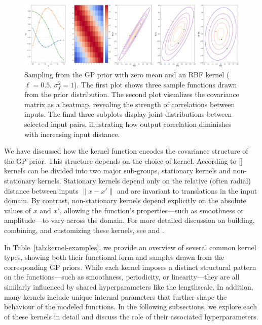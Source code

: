 \documentclass[10pt]{article}
\begin{document}
\begin{figure}[H]
    \centering
       \includegraphics[width=\textwidth]{LatexPlots/1dplots/Kernel_background.png}
        \caption{Sampling from the GP prior with zero mean and an RBF kernel ($\ell = 0.5$, $\sigma_f^2 = 1$). 
        The first plot shows three sample functions drawn from the prior distribution. 
        The second plot visualizes the covariance matrix as a heatmap, revealing the strength of correlations between inputs.
        The final three subplots display joint distributions between selected input pairs, illustrating how output correlation diminishes with increasing input distance.}
    \label{fig: samples_from_GP_prior}
\end{figure}


\noindent
We have discussed how the kernel function encodes the covariance structure of the GP prior. This structure depends on the choice of kernel. According to [\cite{bible}]
kernels can be divided into two major sub-groups, stationary kernels and non-stationary kernels. 
Stationary kernels depend only on the relative (often radial) distance between inputs \(\|x - x'\|\) and are invariant to translations 
in the input domain. By contrast, non-stationary kernels depend explicitly on 
the absolute values of \(x\) and \(x'\), allowing the function’s properties—such as smoothness 
or amplitude—to vary across the domain. For more detailed discussion on building, combining, and customizing these kernels, 
see \cite{kernelcookbook} and \cite[Ch.~4]{bible}.

\bigskip

\noindent
In Table~\ref{tab:kernel-examples}, we provide an overview of several common kernel types, 
showing both their functional form and samples drawn from the corresponding GP priors. 
While each kernel imposes a distinct structural pattern on the functions—such as smoothness, periodicity, or linearity—they are all similarly influenced by shared hyperparameters like the lengthscale. 
In addition, many kernels include unique internal parameters that further shape the behaviour of the modeled functions. 
In the following subsections, we explore each of these kernels in detail and discuss the role of their associated hyperparameters.
\end{document}
